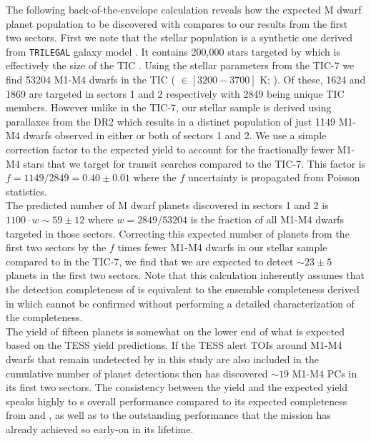 The following back-of-the-envelope calculation reveals how the expected
M dwarf planet population to be discovered with \tess{} compares to our \pipeline{} results
from the first two \tess{} sectors. First we note
that the \cite{sullivan15} stellar population is a synthetic one derived from \texttt{TRILEGAL}
galaxy model \citep{girardi05}. It contains 200,000 stars targeted by \tess{} which is
effectively the size of the TIC \citep{stassun17}. Using the stellar parameters from the TIC-7
we find 53204 M1-M4 dwarfs in the TIC (\teff{} $\in [3200-3700]$ K; \citealt{pecaut13}).
Of these, 1624 and 1869 are targeted in sectors 1 and 2 respectively with 2849
being unique TIC members. However unlike in the TIC-7,
our stellar sample is derived using parallaxes from the \gaia{} DR2 which results in
a distinct population of just 1149 M1-M4 dwarfs observed in either or both of \tess{} sectors 1
and 2. We use a simple correction factor to the expected \tess{} yield to account for the
fractionally fewer M1-M4 stars that we target for transit searches compared to the TIC-7.
This factor is $f=1149/2849 = 0.40 \pm 0.01$ where the $f$ uncertainty
is propagated from Poisson statistics.  \\

The predicted number of M dwarf \tess{} planets discovered in sectors 1 and 2 is
$1100\cdot w \sim 59 \pm 12$ where $w=2849/53204$ is the fraction of all M1-M4 dwarfs targeted in
those sectors. Correcting this expected number of planets from the first two \tess{} sectors
by the $f$ times fewer M1-M4 dwarfs in our stellar sample compared to in the TIC-7,
we find that we are expected to detect
$\sim 23 \pm 5$ planets in the first two \tess{} sectors.
Note that this calculation inherently assumes that the detection
completeness of \pipeline{} is equivalent to the ensemble completeness derived in \cite{ballard18}
which cannot be confirmed without performing a detailed characterization of the \pipeline{}
completeness. \\

The \pipeline{} yield of fifteen planets
is somewhat on the lower end of what is expected based on the TESS yield predictions.
If the TESS alert TOIs around M1-M4 dwarfs that remain undetected by \pipeline{} in this study are
also included in the cumulative number of planet detections then \tess{} has discovered $\sim 19$
M1-M4 PCs in its first two sectors.
The consistency between the \pipeline{} yield and the expected \tess{} yield speaks highly to s
overall performance compared to its expected completeness from \cite{sullivan15} and
\cite{ballard18}, as well as to the outstanding performance that the \tess{} mission has
already achieved so early-on in its lifetime. \\


